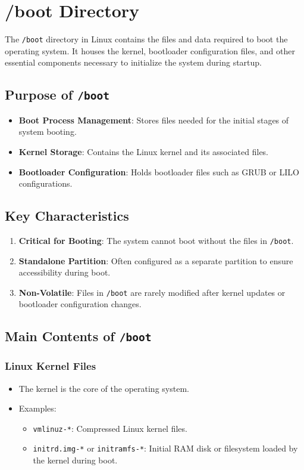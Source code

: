 \section{/boot Directory}

The \texttt{/boot} directory in Linux contains the files and data required to boot the operating system. It houses the kernel, bootloader configuration files, and other essential components necessary to initialize the system during startup.

\subsection*{Purpose of \texttt{/boot}}

\begin{itemize}
    \item \textbf{Boot Process Management}: Stores files needed for the initial stages of system booting.
    \item \textbf{Kernel Storage}: Contains the Linux kernel and its associated files.
    \item \textbf{Bootloader Configuration}: Holds bootloader files such as GRUB or LILO configurations.
\end{itemize}

\subsection*{Key Characteristics}

\begin{enumerate}
    \item \textbf{Critical for Booting}: The system cannot boot without the files in \texttt{/boot}.
    \item \textbf{Standalone Partition}: Often configured as a separate partition to ensure accessibility during boot.
    \item \textbf{Non-Volatile}: Files in \texttt{/boot} are rarely modified after kernel updates or bootloader configuration changes.
\end{enumerate}

\subsection*{Main Contents of \texttt{/boot}}

\subsubsection*{Linux Kernel Files}
\begin{itemize}
    \item The kernel is the core of the operating system.
    \item Examples:
    \begin{itemize}
        \item \texttt{vmlinuz-*}: Compressed Linux kernel files.
        \item \texttt{initrd.img-*} or \texttt{initramfs-*}: Initial RAM disk or filesystem loaded by the kernel during boot.
    \end{itemize}
\end{itemize}

